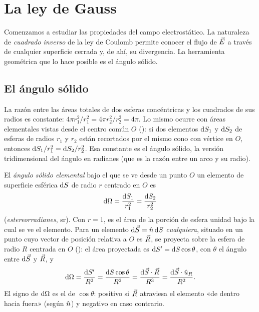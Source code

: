 \section{La ley de Gauss}\label{sec:gauss}
Comenzamos a estudiar las propiedades del campo electrostático. La naturaleza de \emph{cuadrado inverso} de la ley de
Coulomb permite conocer el flujo de $\vec{E}$ a través de cualquier superficie cerrada y, de ahí, su divergencia. La herramienta
geométrica que lo hace posible es el ángulo sólido.

\subsection{El ángulo sólido}\label{sec:angulo-solido}
La razón entre las áreas totales de dos esferas concéntricas y los cuadrados de sus radios es constante:
$4\pi r_1^{2}/r_1^{2}=4\pi r_2^{2}/r_2^{2}=4\pi$. Lo mismo ocurre con áreas elementales vistas desde el centro
común $O$ (): si dos elementos $\mathrm{d} S_1$ y $\mathrm{d} S_2$ de esferas de radios $r_1$ y $r_2$ están
recortados por el mismo cono con vértice en $O$, entonces $\mathrm{d} S_1/r_1^{2}=\mathrm{d} S_2/r_2^{2}$. Esa constante es el
ángulo sólido, la versión tridimensional del ángulo en radianes (que es la razón entre un arco y su radio).

\begin{definicion}\label{def:angulo-solido}
El \emph{ángulo sólido elemental} bajo el que se ve desde un punto $O$ un elemento de superficie esférica
$\mathrm{d} S$ de radio $r$ centrado en $O$ es
\begin{equation}\label{eq:angulo-esfera}
  \mathrm{d}\Omega=\frac{\mathrm{d} S_1}{r_1^{2}}=\frac{\mathrm{d} S_2}{r_2^{2}}
\end{equation}
(\emph{estereorradianes}, sr). Con $r=1$, es el área de la porción de esfera unidad bajo la cual se ve el elemento.
Para un elemento $\mathrm{d}\vec{S}=\hat{n}\,\mathrm{d} S$ \emph{cualquiera}, situado en un punto cuyo vector de posición relativa a $O$ es
$\vec{R}$, se proyecta sobre la esfera de radio $R$ centrada en $O$ (): el área proyectada
es $\mathrm{d} S'=\mathrm{d} S\cos\theta$, con $\theta$ el ángulo entre $\mathrm{d}\vec{S}$ y $\vec{R}$, y
\begin{equation}\label{eq:angulo-general}
  \mathrm{d}\Omega=\frac{\mathrm{d} S'}{R^{2}}=\frac{\mathrm{d} S\cos\theta}{R^{2}}=\frac{\mathrm{d}\vec{S}\cdot\vec{R}}{R^{3}}=\frac{\mathrm{d}\vec{S}\cdot\hat{u}_{R}}{R^{2}}.
\end{equation}
El signo de $\mathrm{d}\Omega$ es el de $\cos\theta$: positivo si $\vec{R}$ atraviesa el elemento «de dentro hacia fuera»
(según $\hat{n}$) y negativo en caso contrario.
\end{definicion}

